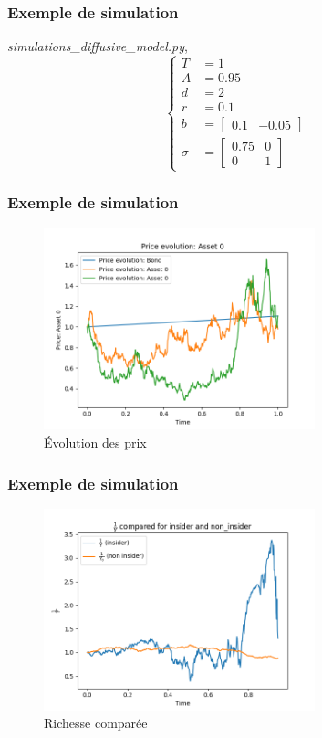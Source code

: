 \documentclass{beamer}
\begin{document}
\begin{frame}
\frametitle{Exemple de simulation}
\par \emph{simulations\_diffusive\_model.py}, 
\begin{displaymath}
\begin{cases}
T &= 1 \\
A &= 0.95 \\
d &= 2 \\
r &= 0.1 \\
b &= \begin{bmatrix}
		0.1 & -0.05
	\end{bmatrix} \\
\sigma &= \begin{bmatrix}
			0.75 & 0 \\
			0 & 1
		  \end{bmatrix}
\end{cases}
\end{displaymath}
\end{frame}

\begin{frame}
\frametitle{Exemple de simulation}
\begin{figure}[H]
  \centering
    \includegraphics[width=0.7\textwidth]{images/simulation_1/prices.png}
  \caption{Évolution des prix}
\end{figure}

\end{frame}

\begin{frame}
\frametitle{Exemple de simulation}
\begin{figure}[H]
  \centering
    \includegraphics[width=0.7\textwidth]{images/simulation_1/compared_wealths.png}
  \caption{Richesse comparée}
\end{figure}
\end{frame}
\end{document}
